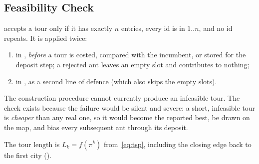 \documentclass[11pt,a4paper]{article}
\begin{document}
\subsection{Feasibility Check}\label{sec:feas}
 accepts a tour only if it has exactly $n$ entries, every id is in
$1..n$, and no id repeats. It is applied twice:
\begin{enumerate}
  \item in , \emph{before} a tour is costed, compared with the incumbent, or stored for
        the deposit step; a rejected ant leaves an empty slot and contributes to nothing;
  \item in , as a second line of defence (which also skips the empty slots).
\end{enumerate}
The construction procedure cannot currently produce an infeasible tour. The check exists because the
failure would be silent and severe: a short, infeasible tour is \emph{cheaper} than any real one, so it
would become the reported best, be drawn on the map, and bias every subsequent ant through its deposit.

The tour length is $L_k=f(\pi^k)$ from~\eqref{eq:tsp}, including the closing edge back to the first city
().
\end{document}
